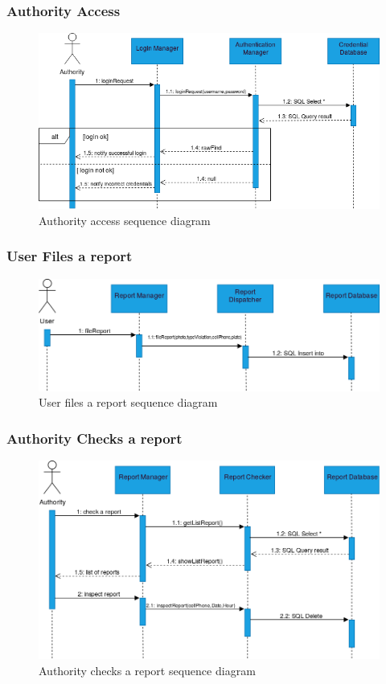 \subsubsection{Authority Access}
	\begin{figure}[H]
		\includegraphics[width=\textwidth]{Images/RunTimeViewAuthorityAccess.png}
		\caption{\label{fig:AuthorityAccess}Authority access sequence diagram}	
	\end{figure}
\subsubsection{User Files a report}
	\begin{figure}[H]
		\includegraphics[width=\textwidth]{Images/RunTimeViewUserReport.png}		
		\caption{\label{fig:UserReport}User files a report sequence diagram}
	\end{figure}
\subsubsection{Authority Checks a report}
	\begin{figure}[H]
		\includegraphics[width=\textwidth]{Images/RunTimeViewAuthorityCheck.png}		
		\caption{\label{fig:UserReport}Authority checks a report sequence diagram}
	\end{figure}
